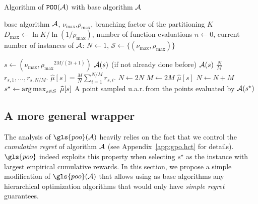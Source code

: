 \begin{algorithm}[ht]
\centering
\caption{Algorithm of $\texttt{POO}(\mathcal{A})$ with base algorithm $\mathcal{A}$}
\label{alg:pct}
\begin{algorithmic}[1]
     base algorithm $\mathcal{A}$, $\nu_{\max}$,$\rho_{\max}$, branching factor of the partitioning $K$
     $D_{\max} \gets \ln K/\ln\left( 1/\rho_{\max}\right)$, number of function evaluations $n \gets 0$, current number of instances of $\mathcal{A}$: $N \gets 1$, $\mathcal{S} \gets \{(\nu_{\max},\rho_{\max})\}$
    
        		\State $s \gets \left(\nu_{\max},{\rho_{\max}}^{2M/(2i+1)}\right)$
        		\State {} $\mathcal{A}(s)$ (if not already done before) 
        		\State {} $\mathcal{A}(s)$  $\frac{N}{M}$  $r_{s,1},\ldots,r_{s,N/M}$.
        		\State {} $\widehat{\mu}[s] = \frac{M}{N}\sum_{i=1}^{N/M}r_{s,i}.$
        	\EndFor
            \State $N \gets 2N$
            \State $M \gets 2M$
        \EndWhile
        \State {} 
        \State {} $\widehat{\mu}[s]$
        \State $N \gets N+M$
    \EndWhile
    \State $s^\star \gets \operatorname*{arg\,max}_{s\in\mathcal{S}}~\widehat{\mu}[s]$
     A point sampled u.a.r.\,from the points evaluated by $\mathcal{A}(s^\star)$
\end{algorithmic}
\end{algorithm}

\subsection{A more general wrapper}\label{sec:gpo.gpo.gpo}

The analysis of $\gls{poo}(\cA)$ heavily relies on the fact that we control the \emph{cumulative regret} of algorithm $\mathcal{A}$ (see Appendix~\ref{app:gpo.hct} for details). $\gls{poo}$ indeed exploits this property when selecting $s^\star$ as the instance with largest empirical cumulative rewards. In this section, we propose a simple modification of $\gls{poo}(\cA)$ that allows using as base algorithms any hierarchical optimization algorithms that would only have \emph{simple regret} guarantees. 

